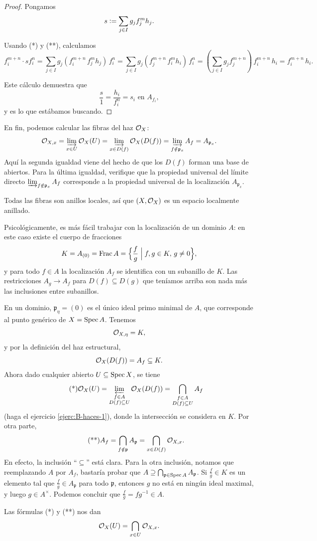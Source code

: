 \documentclass{article}
\numberwithin{equation}{section}
\theoremstyle{definition}
\begin{document}
\begin{teorema}
\begin{proof}
    Pongamos
    $$s \mathrel{\mathop:}= \sum_{j\in I} g_j f_j^m h_j.$$

    Usando (*) y (**), calculamos
    \[ f_i^{m+n} \cdot s f_i^n =
       \sum_{j\in I} g_j (f_i^{m+n}\,f_j^m h_j)\,f_i^n =
       \sum_{j\in I} g_j (f_j^{m+n}\,f_i^m h_i)\,f_i^n =
       \left(\sum_{j\in I} g_j f_j^{m+n}\right)\,f_i^{m+n}\,h_i =
       f_i^{m+n}\,h_i. \]

    Este cálculo demuestra que
    $$\frac{s}{1} = \frac{h_i}{f_i^n} = s_i \text{ en }A_{f_i},$$
    y es lo que estábamos buscando.
  \end{proof}
\end{teorema}

En fin, podemos calcular las fibras del haz $\mathcal{O}_X$:
\[ \mathcal{O}_{X,x} = \varinjlim_{x \in U} \mathcal{O}_X (U) =
   \varinjlim_{x \in D (f)} \mathcal{O}_X (D (f)) =
   \varinjlim_{f \notin \mathfrak{p}_x} A_f = A_{\mathfrak{p}_x}. \]
Aquí la segunda igualdad viene del hecho de que los $D (f)$ forman una base
de abiertos. Para la última igualdad, verifique que la propiedad universal
del límite directo $\varinjlim_{f \notin \mathfrak{p}_x} A_f$ corresponde
a la propiedad universal de la localización $A_{\mathfrak{p}_x}$.

Todas las fibras son anillos locales, así que $(X,\mathcal{O}_X)$ es un espacio
localmente anillado.

\begin{ejemplo}
  Psicológicamente, es más fácil trabajar con la localización de un dominio $A$:
  en este caso existe el cuerpo de fracciones
  $$K = A_{(0)} = \operatorname{Frac} A = \Bigl\{ \frac{f}{g} \Bigm| f,g \in K, \, g \ne 0 \Bigr\},$$
  y para todo $f \in A$ la localización $A_f$ se identifica con un subanillo de
  $K$. Las restricciones $A_g \to A_f$ para $D (f) \subseteq D (g)$ que teníamos
  arriba son nada más las inclusiones entre subanillos.

  En un dominio, $\mathfrak{p}_\eta = (0)$ es el único ideal primo minimal
  de $A$, que corresponde al punto genérico de $X = \operatorname{Spec} A$. Tenemos
  $$\mathcal{O}_{X,\eta} = K,$$
  y por la definición del haz estructural,
  $$\mathcal{O}_X (D (f)) = A_f \subseteq K.$$
  Ahora dado cualquier abierto $U \subseteq \operatorname{Spec} X$, se tiene
  \[ \tag{*} \mathcal{O}_X (U) =
     \varprojlim_{\substack{f \in A \\ D (f) \subseteq U}} \mathcal{O}_X (D (f)) =
     \bigcap_{\substack{f \in A \\ D (f) \subseteq U}} A_f \]
  (haga el ejercicio \ref{ejerc:B-haces-1}), donde la intersección se considera
  en $K$. Por otra parte,
  \[ \tag{**} A_f = \bigcap_{f \notin \mathfrak{p}} A_\mathfrak{p} =
     \bigcap_{x \in D (f)} \mathcal{O}_{X,x}. \]
  En efecto, la inclusión ``$\subseteq$'' está clara. Para la otra inclusión,
  notamos que reemplazando $A$ por $A_f$, bastaría probar que
  $A \supseteq \bigcap_{\mathfrak{p} \in \operatorname{Spec} A} A_\mathfrak{p}$.
  Si $\frac{f}{g} \in K$ es un elemento tal que $\frac{f}{g} \in A_\mathfrak{p}$
  para todo $\mathfrak{p}$, entonces $g$ no está en ningún ideal maximal,
  y luego $g \in A^\times$. Podemos concluir que $\frac{f}{g} = fg^{-1} \in A$.

  Las fórmulas (*) y (**) nos dan
  \[ \mathcal{O}_X (U) = \bigcap_{x \in U} \mathcal{O}_{X,x}. \qedhere \]
\end{ejemplo}
\end{document}
